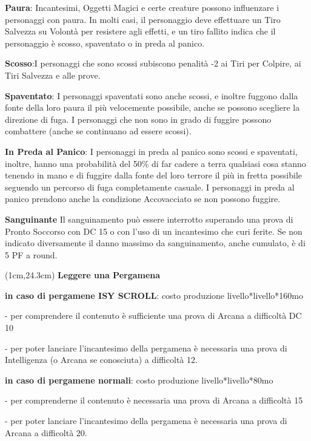 \documentclass[a4paper,12 pt,openany]{book}
\begin{document}
\begin{textblock*}{19 cm}
\begin{multicols}{2}
\textbf{Paura}: Incantesimi, Oggetti Magici e certe creature possono influenzare i personaggi con paura. In molti casi, il personaggio deve effettuare un Tiro Salvezza su Volontà per resistere agli effetti, e un tiro fallito indica che il personaggio è scosso, spaventato o in preda al panico.

\textbf{Scosso}:I personaggi che sono scossi subiscono penalità -2 ai Tiri per Colpire, ai Tiri Salvezza e alle prove.

\textbf{Spaventato}: I personaggi spaventati sono anche scossi, e inoltre fuggono dalla fonte della loro paura il più velocemente possibile, anche se possono scegliere la direzione di fuga.
I personaggi che non sono in grado di fuggire possono combattere (anche se continuano ad essere scossi).

\textbf{In Preda al Panico}: I personaggi in preda al panico sono scossi e spaventati, inoltre, hanno una probabilità del 50\% di far cadere a terra qualsiasi cosa stanno tenendo in mano e di fuggire dalla fonte del loro terrore il più in fretta possibile seguendo un percorso di fuga completamente casuale.
I personaggi in preda al panico prendono anche la condizione Accovacciato se non possono fuggire.

\textbf{Sanguinante} Il sanguinamento può essere interrotto superando una prova di Pronto Soccorso con DC 15 o con l'uso di un incantesimo che curi ferite.
Se non indicato diversamente il danno massimo da sanguinamento, anche cumulato, è di 5 PF a round.
\end{multicols}

	\end{textblock*}


	\begin{textblock*}{19 cm}(1cm,24.3cm)
\textbf{Leggere una Pergamena}

\textbf{in caso di pergamene ISY SCROLL}: costo produzione livello*livello*160mo

- per comprendere il contenuto è sufficiente una prova di Arcana a difficoltà DC 10

- per poter lanciare l'incantesimo della pergamena è necessaria una prova di Intelligenza (o Arcana se conosciuta) a difficoltà 12.


\textbf{in caso di pergamene normali}: costo produzione livello*livello*80mo

- per comprenderne il contenuto è necessaria una prova di Arcana a difficoltà 15

- per poter lanciare l'incantesimo della pergamena è necessaria una prova di Arcana a difficoltà 20.
	\end{textblock*}
\end{document}
